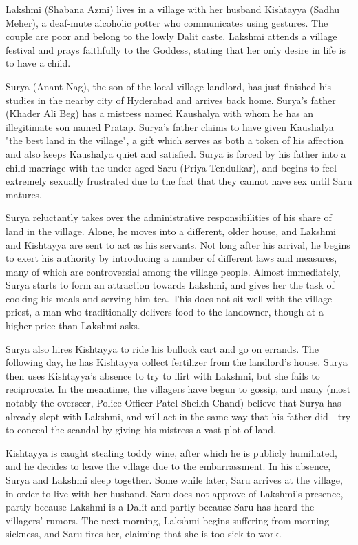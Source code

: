 \documentclass{article}
\begin{document}
Lakshmi (Shabana Azmi) lives in a village with her husband Kishtayya (Sadhu Meher), a deaf-mute alcoholic potter who communicates using gestures. The couple are poor and belong to the lowly Dalit caste. Lakshmi attends a village festival and prays faithfully to the Goddess, stating that her only desire in life is to have a child.

Surya (Anant Nag), the son of the local village landlord, has just finished his studies in the nearby city of Hyderabad and arrives back home. Surya's father (Khader Ali Beg) has a mistress named Kaushalya with whom he has an illegitimate son named Pratap. Surya's father claims to have given Kaushalya "the best land in the village", a gift which serves as both a token of his affection and also keeps Kaushalya quiet and satisfied. Surya is forced by his father into a child marriage with the under aged Saru (Priya Tendulkar), and begins to feel extremely sexually frustrated due to the fact that they cannot have sex until Saru matures.

Surya reluctantly takes over the administrative responsibilities of his share of land in the village. Alone, he moves into a different, older house, and Lakshmi and Kishtayya are sent to act as his servants. Not long after his arrival, he begins to exert his authority by introducing a number of different laws and measures, many of which are controversial among the village people. Almost immediately, Surya starts to form an attraction towards Lakshmi, and gives her the task of cooking his meals and serving him tea. This does not sit well with the village priest, a man who traditionally delivers food to the landowner, though at a higher price than Lakshmi asks.

Surya also hires Kishtayya to ride his bullock cart and go on errands. The following day, he has Kishtayya collect fertilizer from the landlord's house. Surya then uses Kishtayya's absence to try to flirt with Lakshmi, but she fails to reciprocate. In the meantime, the villagers have begun to gossip, and many (most notably the overseer, Police Officer Patel Sheikh Chand) believe that Surya has already slept with Lakshmi, and will act in the same way that his father did - try to conceal the scandal by giving his mistress a vast plot of land.

Kishtayya is caught stealing toddy wine, after which he is publicly humiliated, and he decides to leave the village due to the embarrassment. In his absence, Surya and Lakshmi sleep together. Some while later, Saru arrives at the village, in order to live with her husband. Saru does not approve of Lakshmi's presence, partly because Lakshmi is a Dalit and partly because Saru has heard the villagers' rumors. The next morning, Lakshmi begins suffering from morning sickness, and Saru fires her, claiming that she is too sick to work.
\end{document}
